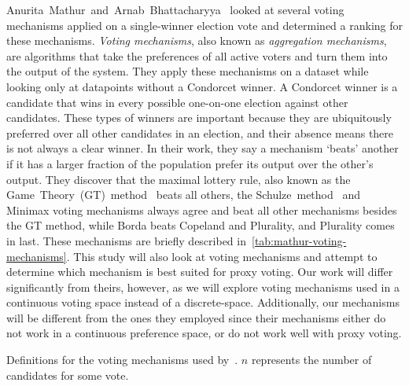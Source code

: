 Anurita~Mathur~and~Arnab~Bhattacharyya~\cite{Mathur2017} looked at several voting
mechanisms applied on a single-winner election vote and determined a ranking for
these mechanisms.
\textit{Voting mechanisms}, also known as \textit{aggregation mechanisms}, are
algorithms that take the preferences of all active voters and turn them into the
output of the system.
They apply these mechanisms on a dataset while looking only at datapoints without a
Condorcet winner.
A Condorcet winner is a candidate that wins in every possible one-on-one election
against other candidates.
These types of winners are important because they are ubiquitously preferred over
all other candidates in an election, and their absence means there is not always a
clear winner.
In their work, they say a mechanism `beats' another if it has a larger fraction of
the population prefer its output over the other's output.
They discover that the maximal lottery rule, also known as the
Game~Theory~(GT)~method~\cite{Rivest2010} beats all others, the
Schulze~method~\cite{Schulze2011} and Minimax voting mechanisms always agree and beat
all other mechanisms besides the GT method, while Borda beats Copeland and Plurality,
and Plurality comes in last.
These mechanisms are briefly described in~\autoref{tab:mathur-voting-mechanisms}.
This study will also look at voting mechanisms and attempt to determine which
mechanism is best suited for proxy voting.
Our work will differ significantly from theirs, however, as we will explore voting
mechanisms used in a continuous voting space instead of a discrete-space.
Additionally, our mechanisms will be different from the ones they employed since
their mechanisms either do not work in a continuous preference space, or do not work
well with proxy voting.

\begin{table}[htbp]
    \renewcommand{\arraystretch}{1.3}

    \caption{
        Definitions for the voting mechanisms used by~\cite{Mathur2017}.
        $n$ represents the number of candidates for some vote.
    }
    \label{tab:mathur-voting-mechanisms}

    \centering
    
\end{table}
%


